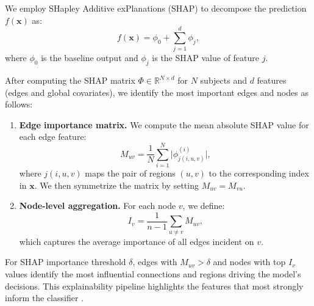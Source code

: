 \documentclass[doubleblind]{ecai}
\begin{document}
We employ SHapley Additive exPlanations (SHAP) \cite{gilpin2018explaining} to decompose the prediction $f(\mathbf{x})$ as:
\begin{equation}
  f(\mathbf{x}) = \phi_{0} + \sum_{j=1}^{d} \phi_{j},
\end{equation}
where $\phi_{0}$ is the baseline output and $\phi_{j}$ is the SHAP value of feature $j$.  

After computing the SHAP matrix $\Phi \in \mathbb{R}^{N \times d}$ for $N$ subjects and $d$ features (edges and global covariates), we identify the most important edges and nodes as follows:

\begin{enumerate}
  \item \textbf{Edge importance matrix.}  
    We compute the mean absolute SHAP value for each edge feature:
    \begin{equation} \label{eq1:edge}
  M_{uv} = \frac{1}{N} \sum_{i=1}^{N} \bigl| \phi_{j(i,u,v)}^{(i)} \bigr|,
\end{equation}
where $j(i,u,v)$ maps the pair of regions $(u,v)$ to the corresponding index in $\mathbf{x}$. We then symmetrize the matrix by setting $M_{uv} = M_{vu}$.

  \item \textbf{Node-level aggregation.}  
    For each node $v$, we define:
    \begin{equation} \label{eq1:node}
  I_{v} = \frac{1}{n-1} \sum_{u \neq v} M_{uv},
\end{equation}
    which captures the average importance of all edges incident on $v$.
\end{enumerate}

For SHAP importance threshold $\delta$, edges with $M_{uv} > \delta$ and nodes with top $I_v$ values identify the most influential connections and regions driving the model's decisions. This explainability pipeline highlights the features that most strongly inform the classifier \cite{lundberg2017unified}.

\end{document}
